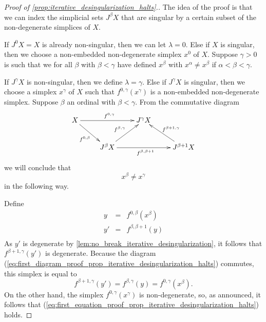 \begin{proof}[Proof of \cref{prop:iterative_desingularization_halts}.]
The idea of the proof is that we can index the simplicial sets $J^\beta X$ that are singular by a certain subset of the non-degenerate simplices of $X$.

If $J^0X=X$ is already non-singular, then we can let $\lambda =0$. Else if $X$ is singular, then we choose a non-embedded non-degenerate simplex $x^0$ of $X$. Suppose $\gamma >0$ is such that we for all $\beta$ with $\beta <\gamma$ have defined $x^\beta$ with $x^\alpha \neq x^\beta$ if $\alpha <\beta <\gamma$.

If $J^\gamma X$ is non-singular, then we define $\lambda =\gamma$. Else if $J^\gamma X$ is singular, then we choose a simplex $x^\gamma$ of $X$ such that $f^{0,\gamma }(x^\gamma )$ is a non-embedded non-degenerate simplex. Suppose $\beta$ an ordinal with $\beta <\gamma$. From the commutative diagram
\begin{equation}
\label{eq:first_diagram_proof_prop_iterative_desingularization_halts}
\begin{gathered}
 \xymatrix{
 X \ar[dr]_{f^{0,\beta }} \ar[rr]^{f^{0,\gamma }} && J^\gamma X \\
 & J^\beta X \ar[ur]^{f^{\beta ,\gamma }} \ar[rr]_{f^{\beta ,\beta +1}} && J^{\beta +1}X \ar[lu]_{f^{\beta +1,\gamma }}
 }
 \end{gathered}
\end{equation}
we will conclude that
\begin{equation}\label{eq:first_equation_proof_prop_iterative_desingularization_halts}
x^\beta \neq x^\gamma
\end{equation}
in the following way.

Define
\begin{displaymath}
\begin{array}{rcl}
y & = & f^{0,\beta }( x^\beta) \\
y' & = & f^{\beta ,\beta +1}(y) \\

\end{array}
\end{displaymath}
As $y'$ is degenerate by \cref{lem:no_break_iterative_desingularization}, it follows that $f^{\beta +1,\gamma }(y')$ is degenerate. Because the diagram (\ref{eq:first_diagram_proof_prop_iterative_desingularization_halts}) commutes, this simplex is equal to
\[f^{\beta +1,\gamma }(y')=f^{\beta ,\gamma }(y)=f^{0,\gamma }(x^\beta ).\]
On the other hand, the simplex $f^{0,\gamma }(x^\gamma )$ is non-degenerate, so, as announced, it follows that (\ref{eq:first_equation_proof_prop_iterative_desingularization_halts}) holds.


\end{proof}

